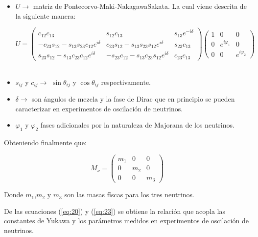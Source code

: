 \documentclass[12pt]{article}
\begin{document}
\begin{itemize}
\item \( U \rightarrow \) matriz de Pontecorvo-Maki-NakagawaSakata. La cual viene descrita de la siguiente manera:

\begin{equation}
        U =  \begin{pmatrix}    c_{12}c_{13} & s_{12}c_{13} & s_{13}e^{-i\delta} \\
         -c_{23}s_{12}-s_{13}s_{23}c_{12}e^{i\delta} &  c_{23}s_{12}-s_{13}s_{23}s_{12}e^{i\delta} & s_{23}c_{13}  \\
         s_{23}s_{12}-s_{13}c_{23}c_{12}e^{i\delta} &  -s_{23}c_{12}-s_{13}c_{23}s_{12}e^{i\delta} & c_{23}c_{13}  \end{pmatrix} \begin{pmatrix}   1 & 0 & 0 \\
         0 &  e^{i\varphi_1} & 0  \\
        0 &  0 & e^{i\varphi_2}  \end{pmatrix}
       \label{eq:24}  
\end{equation} \\

\item \( s_{ij}\) y \(c_{ij} \rightarrow \) \( \sin\theta_{ij}  \) y \( \cos\theta_{ij}  \) respectivamente. 
\item \(\delta \rightarrow \)  son ángulos de mezcla y la fase de
Dirac que en principio se pueden caracterizar en experimentos de oscilación de neutrinos.

\item \(\varphi_1 \) y \(\varphi_2 \) fases adicionales por la naturaleza de Majorana de los neutrinos. 

\end{itemize}

Obteniendo finalmente que: 
 
\begin{equation}
    M_\nu=  \begin{pmatrix} m_1& 0 & 0  \\ 0 & m_2 & 0 \\ 0 &0 & m_3   \end{pmatrix} 
\end{equation} 

Donde \( m_1 \),\( m_2 \) y \( m_3 \) son las masas físcas para los tres neutrinos. 


De las ecuaciones (\ref{eq:20}) y (\ref{eq:23})  se obtiene la relación que acopla las constantes de Yukawa y los parámetros medidos en experimentos de oscilación de neutrinos. 
\end{document}

